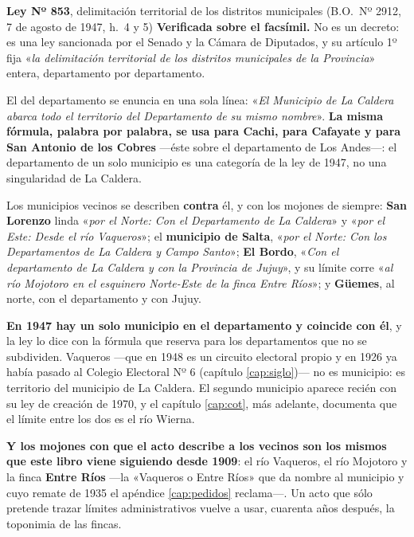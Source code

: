 \begin{ficha}{\textbf{Ley Nº 853}, delimitación territorial de los distritos municipales (B.O.\ Nº 2912, 7 de agosto de 1947, h.\ 4 y 5)}
\textbf{Verificada sobre el facsímil.} No es un decreto: es una ley sancionada por el
Senado y la Cámara de Diputados, y su artículo 1º fija «\textit{la delimitación territorial
de los distritos municipales de la Provincia}» entera, departamento por departamento.

El del departamento se enuncia en una sola línea: «\textit{El Municipio de La Caldera
abarca todo el territorio del Departamento de su mismo nombre}». \textbf{La misma fórmula,
palabra por palabra, se usa para Cachi, para Cafayate y para San Antonio de los Cobres}
---éste sobre el departamento de Los Andes---: el departamento de un solo municipio es una
categoría de la ley de 1947, no una singularidad de La Caldera.

Los municipios vecinos se describen \textbf{contra} él, y con los mojones de siempre:
\textbf{San Lorenzo} linda «\textit{por el Norte: Con el Departamento de La Caldera}» y
«\textit{por el Este: Desde el río Vaqueros}»; el \textbf{municipio de Salta},
«\textit{por el Norte: Con los Departamentos de La Caldera y Campo Santo}»; \textbf{El
Bordo}, «\textit{Con el departamento de La Caldera y con la Provincia de Jujuy}», y su
límite corre «\textit{al río Mojotoro en el esquinero Norte-Este de la finca Entre Ríos}»;
y \textbf{Güemes}, al norte, con el departamento y con Jujuy.
\end{ficha}

\begin{cautela}
\textbf{En 1947 hay un solo municipio en el departamento y coincide con él}, y la ley lo
dice con la fórmula que reserva para los departamentos que no se subdividen. Vaqueros
---que en 1948 es un circuito electoral propio y en 1926 ya había pasado al Colegio
Electoral Nº 6 (capítulo \ref{cap:siglo})--- no es municipio: es territorio del municipio de
La Caldera. El segundo municipio aparece recién con su ley de creación de 1970, y el
capítulo \ref{cap:cot}, más adelante, documenta que el límite entre los dos es el río Wierna.

\textbf{Y los mojones con que el acto describe a los vecinos son los mismos que este libro
viene siguiendo desde 1909}: el río Vaqueros, el río Mojotoro y la finca \textbf{Entre
Ríos} ---la «Vaqueros o Entre Ríos» que da nombre al municipio y cuyo remate de 1935 el
apéndice \ref{cap:pedidos} reclama---. Un acto que sólo pretende trazar límites
administrativos vuelve a usar, cuarenta años después, la toponimia de las fincas.
\end{cautela}

